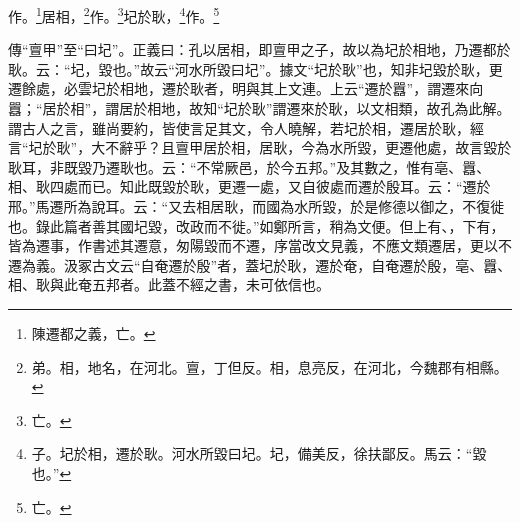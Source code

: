 作。\footnote{陳遷都之義，亡。}居相，\footnote{弟。相，地名，在河北。亶，丁但反。相，息亮反，在河北，今魏郡有相縣。}作。\footnote{亡。}圮於耿，\footnote{子。圮於相，遷於耿。河水所毀曰圮。圮，備美反，徐扶鄙反。馬云：“毀也。”}作。\footnote{亡。}

{\noindent\zhuan{}\fzbyks 傳“亶甲”至“曰圮”。正義曰：孔以居相，即亶甲之子，故以為圮於相地，乃遷都於耿。云：“圮，毀也。”故云“河水所毀曰圮”。據文“圮於耿”也，知非圮毀於耿，更遷餘處，必雲圮於相地，遷於耿者，明與其上文連。上云“遷於囂”，謂遷來向囂；“居於相”，謂居於相地，故知“圮於耿”謂遷來於耿，以文相類，故孔為此解。謂古人之言，雖尚要約，皆使言足其文，令人曉解，若圮於相，遷居於耿，經言“圮於耿”，大不辭乎？且亶甲居於相，居耿，今為水所毀，更遷他處，故言毀於耿耳，非既毀乃遷耿也。云：“不常厥邑，於今五邦。”及其數之，惟有亳、囂、相、耿四處而已。知此既毀於耿，更遷一處，又自彼處而遷於殷耳。云：“遷於邢。”馬遷所為說耳。云：“又去相居耿，而國為水所毀，於是修德以御之，不復徙也。錄此篇者善其國圮毀，改政而不徙。”如鄭所言，稍為文便。但上有、，下有，皆為遷事，作書述其遷意，匆陽毀而不遷，序當改文見義，不應文類遷居，更以不遷為義。汲冢古文云“自奄遷於殷”者，蓋圮於耿，遷於奄，自奄遷於殷，亳、囂、相、耿與此奄五邦者。此蓋不經之書，未可依信也。 \par}

